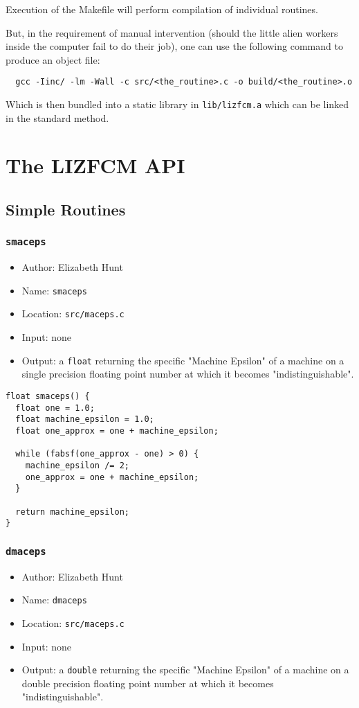 \documentclass[11pt]{article}
\begin{document}
Execution of the Makefile will perform compilation of individual routines.

But, in the requirement of manual intervention (should the little alien workers
inside the computer fail to do their job), one can use the following command to
produce an object file:

\begin{verbatim}
  gcc -Iinc/ -lm -Wall -c src/<the_routine>.c -o build/<the_routine>.o
\end{verbatim}

Which is then bundled into a static library in \texttt{lib/lizfcm.a} which can be linked
in the standard method.

\section{The LIZFCM API}
\label{sec:org91f4707}
\subsection{Simple Routines}
\label{sec:orgc8c57e4}
\subsubsection{\texttt{smaceps}}
\label{sec:orgfeb6ef6}
\begin{itemize}
\item Author: Elizabeth Hunt
\item Name: \texttt{smaceps}
\item Location: \texttt{src/maceps.c}
\item Input: none
\item Output: a \texttt{float} returning the specific "Machine Epsilon" of a machine on a
single precision floating point number at which it becomes "indistinguishable".
\end{itemize}

\begin{verbatim}
float smaceps() {
  float one = 1.0;
  float machine_epsilon = 1.0;
  float one_approx = one + machine_epsilon;

  while (fabsf(one_approx - one) > 0) {
    machine_epsilon /= 2;
    one_approx = one + machine_epsilon;
  }

  return machine_epsilon;
}
\end{verbatim}

\subsubsection{\texttt{dmaceps}}
\label{sec:orgb3dc0f2}
\begin{itemize}
\item Author: Elizabeth Hunt
\item Name: \texttt{dmaceps}
\item Location: \texttt{src/maceps.c}
\item Input: none
\item Output: a \texttt{double} returning the specific "Machine Epsilon" of a machine on a
double precision floating point number at which it becomes "indistinguishable".
\end{itemize}
\end{document}
